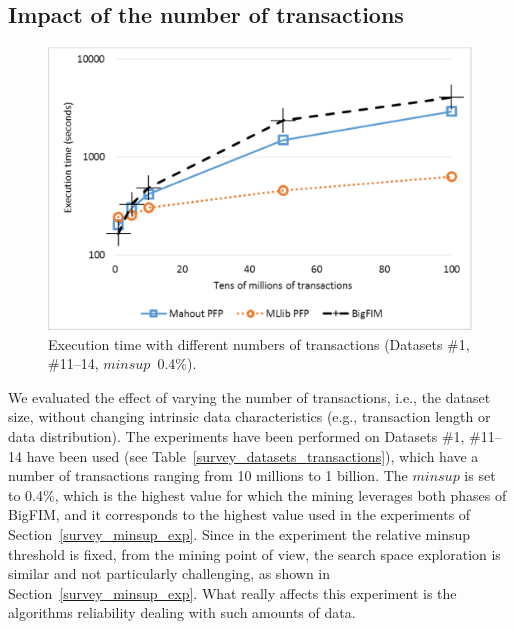 



\subsection{Impact of the number of transactions}
\label{survey_transaction_exp}

\begin{figure}[!t]
\includegraphics[width=5in]{transactions_log.eps}
\caption{Execution time with different numbers of transactions
 (Datasets \#1, \#11--14,
 $minsup$~0.4\%).}
\label{transactions}
\end{figure}

We evaluated the effect of varying the number of transactions,
i.e., the dataset size, without changing intrinsic data characteristics (e.g., 
transaction length or data distribution).
The experiments have been performed on Datasets \#1, \#11--14 have been used
(see Table~\ref{survey_datasets_transactions}),
which have a number of transactions
ranging from 10 millions to 1 billion.
The $minsup$ is set to 0.4\%,
which is the highest value for which the mining leverages both phases of
BigFIM, and it corresponds to the highest value used
in the experiments of Section~\ref{survey_minsup_exp}.
Since in the experiment the relative minsup threshold is fixed, from the mining point of view, the search space exploration is similar and not particularly challenging, as shown in Section~\ref{survey_minsup_exp}. What really affects this experiment is the algorithms reliability dealing with such amounts of data.

